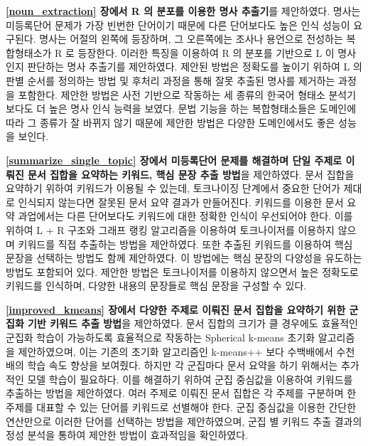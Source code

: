 \documentclass[oneside, ko,phd]{snuthesis_utf8_kor}
\begin{document}
\textbf{\ref{noun_extraction} 장에서 R 의 분포를 이용한 명사 추출기}를 제안하였다.
명사는 미등록단어 문제가 가장 빈번한 단어이기 때문에 다른 단어보다도 높은 인식 성능이 요구된다.
명사는 어절의 왼쪽에 등장하며, 그 오른쪽에는 조사나 용언으로 전성하는 복합형태소가 R 로 등장한다.
이러한 특징을 이용하여 R 의 분포를 기반으로 L 이 명사인지 판단하는 명사 추출기를 제안하였다.
제안된 방법은 정확도를 높이기 위하여 L 의 판별 순서를 정의하는 방법 및 후처리 과정을 통해 잘못 추출된 명사를 제거하는 과정을 포함한다.
제안한 방법은 사전 기반으로 작동하는 세 종류의 한국어 형태소 분석기보다도 더 높은 명사 인식 능력을 보였다.
문법 기능을 하는 복합형태소들은 도메인에 따라 그 종류가 잘 바뀌지 않기 때문에 제안한 방법은 다양한 도메인에서도 좋은 성능을 보인다.

\textbf{\ref{summarize_single_topic} 장에서 미등록단어 문제를 해결하며 단일 주제로 이뤄진 문서 집합을 요약하는 키워드, 핵심 문장 추출 방법}을 제안하였다.
문서 집합을 요약하기 위하여 키워드가 이용될 수 있는데, 토크나이징 단계에서 중요한 단어가 제대로 인식되지 않는다면 잘못된 문서 요약 결과가 만들어진다.
키워드를 이용한 문서 요약 과업에서는 다른 단어보다도 키워드에 대한 정확한 인식이 우선되어야 한다.
이를 위하여 L + R 구조와 그래프 랭킹 알고리즘을 이용하여 토크나이저를 이용하지 않으며 키워드를 직접 추출하는 방법을 제안하였다.
또한 추출된 키워드를 이용하여 핵심 문장을 선택하는 방법도 함께 제안하였다.
이 방법에는 핵심 문장의 다양성을 유도하는 방법도 포함되어 있다.
제안한 방법은 토크나이저를 이용하지 않으면서 높은 정확도로 키워드를 인식하며, 다양한 내용의 문장들로 핵심 문장을 구성할 수 있다.

\textbf{\ref{improved_kmeans} 장에서 다양한 주제로 이뤄진 문서 집합을 요약하기 위한 군집화 기반 키워드 추출 방법}을 제안하였다.
문서 집합의 크기가 클 경우에도 효율적인 군집화 학습이 가능하도록 효율적으로 작동하는 Spherical k-means 초기화 알고리즘을 제안하였으며, 이는 기존의 초기화 알고리즘인 k-means++ 보다 수백배에서 수천배의 학습 속도 향상을 보여줬다.
하지만 각 군집마다 문서 요약을 하기 위해서는 추가적인 모델 학습이 필요하다.
이를 해결하기 위하여 군집 중심값을 이용하여 키워드를 추출하는 방법을 제안하였다.
여러 주제로 이뤄진 문서 집합은 각 주제를 구분하며 한 주제를 대표할 수 있는 단어를 키워드로 선별해야 한다.
군집 중심값을 이용한 간단한 연산만으로 이러한 단어를 선택하는 방법을 제안하였으며, 군집 별 키워드 추출 결과의 정성 분석을 통하여 제안한 방법이 효과적임을 확인하였다.
\end{document}
